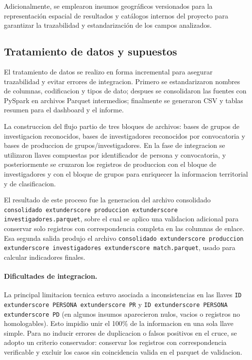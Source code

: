 \documentclass[12pt,letterpaper]{article}
\begin{document}
Adicionalmente, se emplearon insumos geográficos versionados para la representación espacial de resultados y catálogos internos del proyecto para garantizar la trazabilidad y estandarización de los campos analizados.

\subsection{Tratamiento de datos y supuestos}

El tratamiento de datos se realizo en forma incremental para asegurar trazabilidad y evitar errores de integracion. Primero se estandarizaron nombres de columnas, codificacion y tipos de dato; despues se consolidaron las fuentes con PySpark en archivos Parquet intermedios; finalmente se generaron CSV y tablas resumen para el dashboard y el informe.

La construccion del flujo partio de tres bloques de archivos: bases de grupos de investigacion reconocidos, bases de investigadores reconocidos por convocatoria y bases de produccion de grupos/investigadores. En la fase de integracion se utilizaron llaves compuestas por identificador de persona y convocatoria, y posteriormente se cruzaron los registros de produccion con el bloque de investigadores y con el bloque de grupos para enriquecer la informacion territorial y de clasificacion.

El resultado de este proceso fue la generacion del archivo consolidado \texttt{consolidado	extunderscore produccion	extunderscore investigadores.parquet}, sobre el cual se aplico una validacion adicional para conservar solo registros con correspondencia completa en las columnas de enlace. Esa segunda salida produjo el archivo \texttt{consolidado	extunderscore produccion	extunderscore investigadores	extunderscore match.parquet}, usado para calcular indicadores finales.

\paragraph{Dificultades de integracion.}
La principal limitacion tecnica estuvo asociada a inconsistencias en las llaves \texttt{ID	extunderscore PERSONA	extunderscore PR} y \texttt{ID	extunderscore PERSONA	extunderscore PD} (en algunos insumos aparecieron nulos, vacios o registros no homologables). Esto impidio unir el 100\% de la informacion en una sola llave simple. Para no inducir errores de duplicacion o falsos positivos en el cruce, se adopto un criterio conservador: conservar los registros con correspondencia verificable y excluir los casos sin coincidencia valida en el parquet de validacion.
\end{document}
